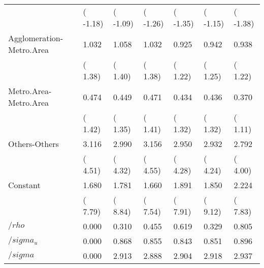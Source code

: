 \begin{center}
\begin{longtable}{}
&(  -1.18)&(  -1.09)&(  -1.26)&(  -1.35)&(  -1.15)&(  -1.38)\\
Agglomeration-Metro.Area &  1.032&  1.058&  1.032&  0.925&  0.942&  0.938\\
&(   1.38)&(   1.40)&(   1.38)&(   1.22)&(   1.25)&(   1.22)\\
Metro.Area-Metro.Area    &  0.474&  0.449&  0.471&  0.434&  0.436&  0.370\\
&(   1.42)&(   1.35)&(   1.41)&(   1.32)&(   1.32)&(   1.11)\\
Others-Others            &  3.116&  2.990&  3.156&  2.950&  2.932&  2.792\\
&(   4.51)&(   4.32)&(   4.55)&(   4.28)&(   4.24)&(   4.00)\\
Constant                 &  1.680&  1.781&  1.660&  1.891&  1.850&  2.224\\
&(   7.79)&(   8.84)&(   7.54)&(   7.91)&(   9.12)&(   7.83)\\
$/rho$&  0.000&  0.310&  0.455&  0.619&  0.329&  0.805\\
$/sigma_u$&  0.000&  0.868&  0.855&  0.843&  0.851&  0.896\\
$/sigma$&  0.000&  2.913&  2.888&  2.904&  2.918&  2.937\\
 \hline
 \end{longtable}
 \end{center}
